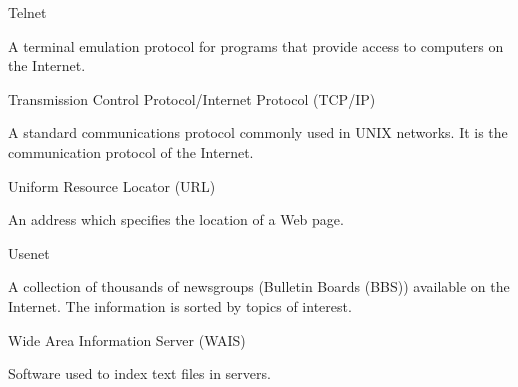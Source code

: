 \begin{htmllist}
\item[Telnet]

A terminal emulation protocol for programs that provide access to
computers on the Internet.


\item[Transmission Control Protocol/Internet Protocol (TCP/IP)]

A standard communications protocol commonly used in UNIX networks. It
is the communication protocol of the Internet.


\item[Uniform Resource Locator (URL)]

An address which specifies the location of a Web page.


\item[Usenet]
\label{usenet}

A collection of thousands of newsgroups (Bulletin Boards (BBS))
available on the Internet. The information is sorted by topics of
interest.


\item[Wide Area Information Server (WAIS)]

Software used to index text files in servers.

\end{htmllist}
